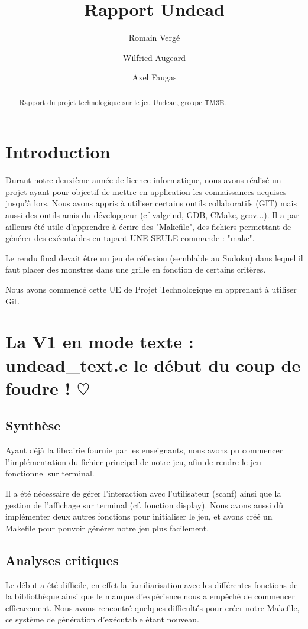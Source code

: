 \documentclass[12pt]{article}
\title{Rapport Undead}
\author[ ]{Romain Vergé}
\author[ ]{Wilfried Augeard}
\author[ ]{Axel Faugas}
\affil[ ]{}
\begin{document}
\maketitle

\begin{abstract}
Rapport du projet technologique sur le jeu Undead, groupe TM3E.
\end{abstract}

\tableofcontents

\section{Introduction}
Durant notre deuxième année de licence informatique, nous avons réalisé un projet ayant pour objectif de mettre en application les connaissances acquises jusqu'à lors. Nous avons appris à utiliser certains outils collaboratifs (GIT) mais aussi des outils amis du développeur (cf valgrind, GDB, CMake, gcov...). Il a par ailleurs été utile d'apprendre à écrire des "Makefile", des fichiers permettant de générer des exécutables en tapant UNE SEULE commande : "make".

Le rendu final devait être un jeu de réflexion (semblable au Sudoku) dans lequel il faut placer des monstres dans une grille en fonction de certains critères.

Nous avons commencé cette UE de Projet Technologique en apprenant à utiliser Git.

\section{La V1 en mode texte : undead\_text.c le début du coup de foudre ! $\heartsuit$}

\subsection{Synthèse}
Ayant déjà la librairie fournie par les enseignants, nous avons pu commencer l'implémentation du fichier principal de notre jeu, afin de rendre le jeu fonctionnel sur terminal.

Il a été nécessaire de gérer l'interaction avec l'utilisateur (scanf) ainsi que la gestion de l'affichage sur terminal (cf. fonction display). Nous avons aussi dû implémenter deux autres fonctions pour initialiser le jeu, et avons créé un Makefile pour pouvoir générer notre jeu plus facilement.

\subsection{Analyses critiques}
Le début a été difficile, en effet la familiarisation avec les différentes fonctions de la bibliothèque ainsi que le manque d'expérience nous a empêché de commencer efficacement.
Nous avons rencontré quelques difficultés pour créer notre Makefile, ce système de génération d'exécutable étant nouveau.
\end{document}
